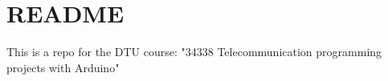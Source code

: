 \chapter{README}
\hypertarget{md__r_e_a_d_m_e}{}\label{md__r_e_a_d_m_e}
This is a repo for the DTU course\+: "{}34338 Telecommunication programming projects with Arduino"{} 